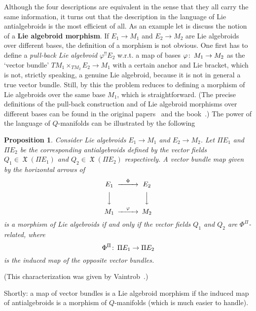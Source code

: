 \documentclass[12pt,reqno,a4paper]{amsart}
\newtheorem{prop}{Proposition}[section]
\theoremstyle{definition}
\begin{document}
Although the four descriptions are equivalent in the sense that they
all carry the same information, it turns out that the description in
the language of Lie antialgebroids is the most efficient of all. As
an example let is discuss the notion of a \textbf{Lie algebroid
morphism}. If  $E_1\to M_1$ and $E_2\to M_2$ are Lie algebroids over
different bases, the definition of a morphism is not obvious. One
first has to define a \textit{pull-back Lie algebroid} ${{\varphi}}^{!!}E_2$
w.r.t. a map of bases ${{\varphi}}{\colon\thinspace} M_1\to M_2$ as the `vector bundle'
$TM_1\times_{TM_2} E_2\to M_1$ with a certain anchor and Lie
bracket, which is not, strictly speaking, a genuine Lie algebroid,
because it is not in general a true vector bundle. Still, by this
the problem reduces to defining a morphism of Lie algebroids over
the same base $M_1$, which is straightforward. (The precise
definitions of the pull-back construction and of  Lie algebroid
morphisms over different bases can be found in the original
papers~\cite{mackenzie:noteonalg87, higgins-mackenzie:algebraic90}
and the book~\cite{mackenzie:book2005}.) The power of the language
of $Q$-manifolds can be illustrated by the following
\begin{prop} Consider Lie algebroids $E_1\to M_1$ and $E_2\to M_2$. Let $\Pi E_1$ and $\Pi E_2$ be the corresponding antialgebroids defined by the vector  fields $Q_1\in \operatorname{\mathfrak{X}}(\Pi E_1)$ and $Q_2\in \operatorname{\mathfrak{X}}(\Pi E_2)$ respectively.
A vector bundle map given by the horizontal
arrows of
\begin{equation*}
    \begin{CD} E_1 @>{\Phi}>> E_2 \\
                @VVV    @VVV\\
                M_1 @>{\varphi}>> M_2
    \end{CD}
\end{equation*}
is a morphism of Lie algebroids if and only if  the vector  fields $Q_1$ and $Q_2$ are
$\Phi^{\Pi}$-related, where $$\Phi^{\Pi}{\colon\thinspace} \Pi E_1\to \Pi E_2$$ is
the  induced map of the opposite vector bundles.
\end{prop}

(This characterization was given by Vaintrob~\cite{vaintrob:algebroids}.)

Shortly: a map of vector bundles is a Lie algebroid morphism if the induced map of antialgebroids is a morphism of $Q$-manifolds (which is much easier to handle).
\end{document}
